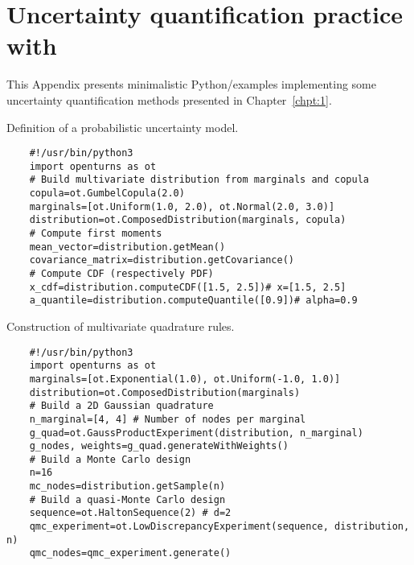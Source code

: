 \cleardoublepage
\chapter{Uncertainty quantification practice with \ot}
\label{apx:D}

This Appendix presents minimalistic Python/\ots examples implementing some uncertainty quantification methods presented in Chapter~\ref{chpt:1}.

\begin{otexample_apx}
    Definition of a probabilistic uncertainty model. 
    \lstset{style=mystyle, language=python}
%
\begin{lstlisting}
    #!/usr/bin/python3
    import openturns as ot
    # Build multivariate distribution from marginals and copula
    copula=ot.GumbelCopula(2.0)
    marginals=[ot.Uniform(1.0, 2.0), ot.Normal(2.0, 3.0)]
    distribution=ot.ComposedDistribution(marginals, copula)
    # Compute first moments
    mean_vector=distribution.getMean()
    covariance_matrix=distribution.getCovariance()
    # Compute CDF (respectively PDF)
    x_cdf=distribution.computeCDF([1.5, 2.5])# x=[1.5, 2.5]
    a_quantile=distribution.computeQuantile([0.9])# alpha=0.9
\end{lstlisting}
%
\end{otexample_apx}

\begin{otexample_apx}
    Construction of multivariate quadrature rules.
%
\lstset{style=mystyle, language=python}
\begin{lstlisting}
    #!/usr/bin/python3
    import openturns as ot
    marginals=[ot.Exponential(1.0), ot.Uniform(-1.0, 1.0)]
    distribution=ot.ComposedDistribution(marginals)
    # Build a 2D Gaussian quadrature
    n_marginal=[4, 4] # Number of nodes per marginal
    g_quad=ot.GaussProductExperiment(distribution, n_marginal)
    g_nodes, weights=g_quad.generateWithWeights()
    # Build a Monte Carlo design
    n=16 
    mc_nodes=distribution.getSample(n)
    # Build a quasi-Monte Carlo design
    sequence=ot.HaltonSequence(2) # d=2
    qmc_experiment=ot.LowDiscrepancyExperiment(sequence, distribution, n)
    qmc_nodes=qmc_experiment.generate()
\end{lstlisting}
%
\end{otexample_apx}


